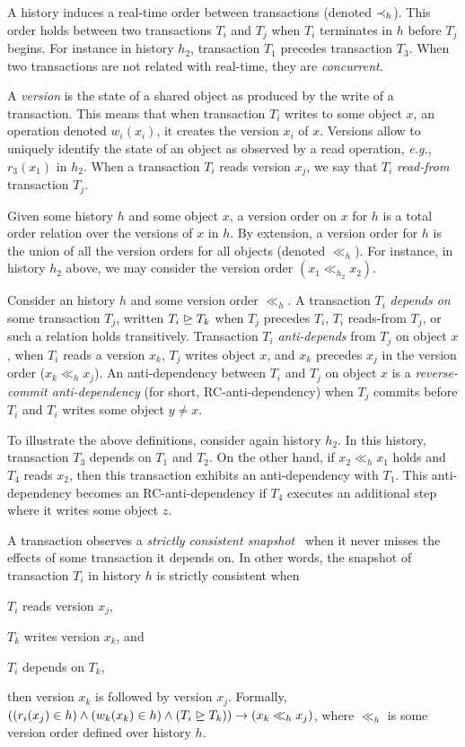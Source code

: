 

A history induces a real-time order between transactions (denoted $\hb_h$).
This order holds between two transactions $T_i$ and $T_j$ when $T_i$ terminates in $h$ before $T_j$ begins.
For instance in history $h_2$, transaction $T_1$ precedes transaction $T_3$.
When two transactions are not related with real-time, they are \emph{concurrent}.

A \emph{version} is the state of a shared object as produced by the write of a transaction.
This means that when transaction $T_i$ writes to some object $x$, an operation denoted $w_i(x_i)$, it creates the version $x_i$ of $x$.
Versions allow to uniquely identify the state of an object as observed by a read operation, \emph{e.g.}, $r_3(x_1)$ in $h_2$.
When a transaction $T_i$ reads version $x_j$, we say that $T_i$ \emph{read-from} transaction $T_j$.

Given some history $h$ and some object $x$, a version order on $x$ for $h$ is a total order relation over the versions of $x$ in $h$.
By extension, a version order for $h$ is the union of all the version orders for all objects (denoted $\ll_h$).
For instance, in history $h_2$ above, we may consider the version order $(x_1 \ll_{h_2} x_2)$.

Consider an history $h$ and some version order $\ll_h$.
A transaction $T_i$ \emph{depends on} some transaction $T_j$, written $T_i \mathrel{\unrhd} T_k$ when $T_j$ precedes $T_i$, $T_i$ reads-from $T_j$, or such a relation holds transitively.
Transaction $T_i$ \emph{anti-depends} from $T_j$ on object $x$, when $T_i$ reads a version $x_k$, $T_j$ writes object $x$, and $x_k$ precedes $x_j$ in the version order ($x_k \ll_{h} x_j$).
An anti-dependency between $T_i$ and $T_j$ on object $x$ is a \emph{reverse-commit anti-dependency} (for short, RC-anti-dependency) \cite{hans16} when $T_j$ commits before $T_i$ and $T_i$ writes some object $y \neq x$.

To illustrate the above definitions, consider again history $h_2$.
In this history, transaction $T_3$ depends on $T_1$ and $T_2$.
On the other hand, if $x_2 \ll_h x_1$ holds and $T_4$ reads $x_2$, then this transaction exhibits an anti-dependency with $T_1$.
This anti-dependency becomes an RC-anti-dependency if $T_4$ executes an additional step where it writes some object $z$.

A transaction observes a \emph{strictly consistent snapshot}~\cite{cc:coh:997} when it never misses the effects of some transaction it depends on.
In other words, the snapshot of transaction $T_i$ in history $h$ is strictly consistent when
\begin{inparaenum}
\item $T_i$ reads version $x_j$,
\item $T_k$ writes version $x_k$, and 
\item $T_i$ depends on $T_{k}$,
\end{inparaenum}
then version $x_k$ is followed by version $x_j$.
Formally, $((r_i(x_j) \in h) \land (w_k(x_k) \in h) \land (T_i \depends T_k)) \implies (x_k \ll_h x_j)$, where $\ll_{h}$ is some version order defined over history $h$.

